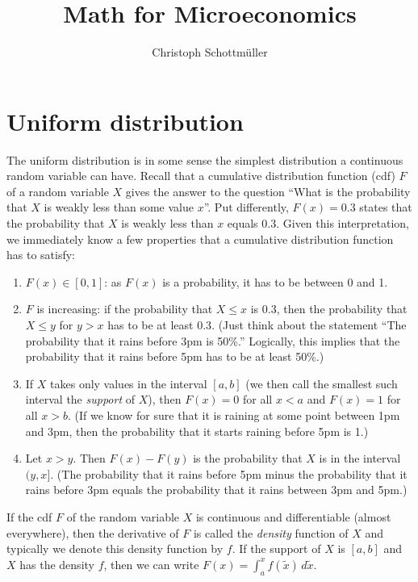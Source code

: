 \documentclass[a4paper,12pt]{article}
\title{Math for Microeconomics}
\author{Christoph Schottm\"uller}
\begin{document}
\maketitle

\section{Uniform distribution}
\label{sec:uniform-distribution}

The uniform distribution is in some sense the simplest distribution a continuous random variable can have. Recall that a cumulative distribution function (cdf) $F$ of a random variable $X$ gives the answer to the question ``What is the probability that  $X$ is weakly less than some value $x$''. Put differently, $F(x)=0.3$ states that the probability that $X$ is weakly less than $x$ equals $0.3$. Given this interpretation, we immediately know a few properties that a cumulative distribution function has to satisfy:
\begin{enumerate}
\item $F(x)\in[0,1]$: as $F(x)$ is a probability, it has to be between 0 and 1.
\item $F$ is increasing: if the probability that $X\leq x$ is $0.3$, then the probability that $X\leq y$ for $y>x$ has to be at least $0.3$. (Just think about the statement ``The probability that it rains before 3pm is 50\%.'' Logically, this implies that the probability that it rains before 5pm has to be at least 50\%.)
\item If $X$ takes only values in the interval $[a,b]$ (we then call the smallest such interval the \emph{support} of $X$), then $F(x)=0$ for all $x<a$ and $F(x)=1$ for all $x>b$. (If we know for sure that it is raining at some point between 1pm and 3pm, then the probability that it starts raining before 5pm is 1.) 
  \item Let $x>y$. Then $F(x)-F(y)$ is the probability that $X$ is in the interval $(y,x]$. (The probability that it rains before 5pm minus the probability that it rains before 3pm equals the probability that it rains between 3pm and 5pm.)
\end{enumerate}

If the cdf $F$ of the random variable $X$ is continuous and differentiable (almost everywhere), then the derivative of $F$ is called the \emph{density} function of $X$ and typically we denote this density function by $f$. If the support of $X$ is $[a,b]$ and $X$ has the density $f$, then we can write $F(x)=\int_{a}^xf(\tilde x)\,d\tilde{x}$.
\end{document}
